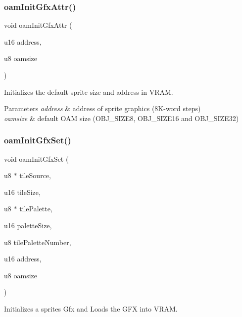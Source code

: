 \subsubsection{\texorpdfstring{oam\+Init\+Gfx\+Attr()}{oamInitGfxAttr()}}
{\footnotesize\ttfamily void oam\+Init\+Gfx\+Attr (\begin{DoxyParamCaption}\item[{u16}]{address,  }\item[{u8}]{oamsize }\end{DoxyParamCaption})}



Initializes the default sprite size and address in V\+R\+AM. 


\begin{DoxyParams}{Parameters}
{\em address} & address of sprite graphics (8\+K-\/word steps) \\
\hline
{\em oamsize} & default O\+AM size (O\+B\+J\+\_\+\+S\+I\+Z\+E8, O\+B\+J\+\_\+\+S\+I\+Z\+E16 and O\+B\+J\+\_\+\+S\+I\+Z\+E32) \\
\hline
\end{DoxyParams}
\mbox{\label{a00350_a46e0be47f8fc865a7f43c1b0b126e59a}} 
\subsubsection{\texorpdfstring{oam\+Init\+Gfx\+Set()}{oamInitGfxSet()}}
{\footnotesize\ttfamily void oam\+Init\+Gfx\+Set (\begin{DoxyParamCaption}\item[{u8 $\ast$}]{tile\+Source,  }\item[{u16}]{tile\+Size,  }\item[{u8 $\ast$}]{tile\+Palette,  }\item[{u16}]{palette\+Size,  }\item[{u8}]{tile\+Palette\+Number,  }\item[{u16}]{address,  }\item[{u8}]{oamsize }\end{DoxyParamCaption})}



Initializes a sprites Gfx and Loads the G\+FX into V\+R\+AM. 


